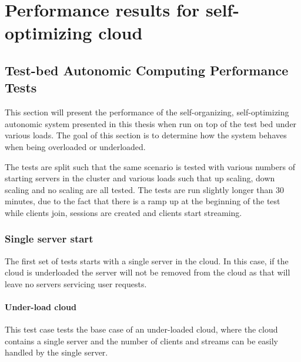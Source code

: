 \chapter{Performance results for self-optimizing cloud} %
\label{Chapter_performance}

\section{Test-bed Autonomic Computing Performance Tests}

This section will present the performance of the self-organizing, self-optimizing autonomic system presented in this thesis when run on top of the test bed under various loads. The goal of this section is to determine how the system behaves when being overloaded or underloaded.

The tests are split such that the same scenario is tested with various numbers of starting servers in the cluster and various loads such that up scaling, down scaling and no scaling are all tested. The tests are run slightly longer than 30 minutes, due to the fact that there is a ramp up at the beginning of the test while clients join, sessions are created and clients start streaming.

\subsection{Single server start}

The first set of tests starts with a single server in the cloud. In this case, if the cloud is underloaded the server will not be removed from the cloud as that will leave no servers servicing user requests.

\subsubsection{Under-load cloud}

This test case tests the base case of an under-loaded cloud, where the cloud contains a single server and the number of clients and streams can be easily handled by the single server.

